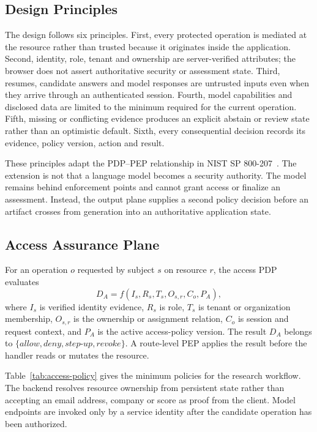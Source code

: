\documentclass[conference]{IEEEtran}
\begin{document}
\subsection{Design Principles}

The design follows six principles. First, every protected operation is mediated at the resource rather than trusted because it originates inside the application. Second, identity, role, tenant and ownership are server-verified attributes; the browser does not assert authoritative security or assessment state. Third, resumes, candidate answers and model responses are untrusted inputs even when they arrive through an authenticated session. Fourth, model capabilities and disclosed data are limited to the minimum required for the current operation. Fifth, missing or conflicting evidence produces an explicit abstain or review state rather than an optimistic default. Sixth, every consequential decision records its evidence, policy version, action and result.

These principles adapt the PDP--PEP relationship in NIST SP 800-207~\cite{rose2020zero}. The extension is not that a language model becomes a security authority. The model remains behind enforcement points and cannot grant access or finalize an assessment. Instead, the output plane supplies a second policy decision before an artifact crosses from generation into an authoritative application state.

\subsection{Access Assurance Plane}

For an operation $o$ requested by subject $s$ on resource $r$, the access PDP evaluates
\begin{equation}
D_{A}=f(I_s,R_s,T_s,O_{s,r},C_o,P_A),
\end{equation}
where $I_s$ is verified identity evidence, $R_s$ is role, $T_s$ is tenant or organization membership, $O_{s,r}$ is the ownership or assignment relation, $C_o$ is session and request context, and $P_A$ is the active access-policy version. The result $D_A$ belongs to $\{\textit{allow},\textit{deny},\textit{step-up},\textit{revoke}\}$. A route-level PEP applies the result before the handler reads or mutates the resource.

Table~\ref{tab:access-policy} gives the minimum policies for the research workflow. The backend resolves resource ownership from persistent state rather than accepting an email address, company or score as proof from the client. Model endpoints are invoked only by a service identity after the candidate operation has been authorized.
\end{document}

